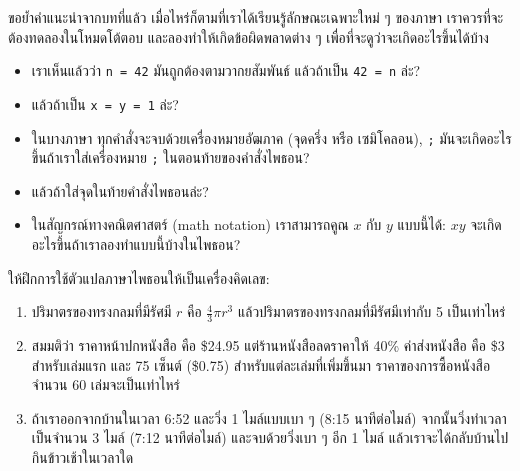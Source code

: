 \begin{exercise}

ขอย้ำคำแนะนำจากบทที่แล้ว เมื่อไหร่ก็ตามที่เราได้เรียนรู้ลักษณะเฉพาะใหม่ ๆ ของภาษา 
เราควรที่จะต้องทดลองในโหมดโต้ตอบ และลองทำให้เกิดข้อผิดพลาดต่าง ๆ 
เพื่อที่จะดูว่าจะเกิดอะไรขึ้นได้บ้าง

\begin{itemize}

\item เราเห็นแล้วว่า {\tt n = 42} มันถูกต้องตามวากยสัมพันธ์  แล้วถ้าเป็น {\tt 42 = n} ล่ะ?

\item แล้วถ้าเป็น {\tt x = y = 1} ล่ะ?

\item ในบางภาษา ทุกคำสั่งจะจบด้วยเครื่องหมายอัฒภาค (จุดครึ่ง หรือ เซมิโคลอน), {\tt ;} 
มันจะเกิดอะไรขึ้นถ้าเราใส่เครื่องหมาย {\tt ;} ในตอนท้ายของคำสั่งไพธอน?

\item แล้วถ้าใส่จุดในท้ายคำสั่งไพธอนล่ะ?

\item ในสัญกรณ์ทางคณิตศาสตร์ (math notation) เราสามารถคูณ $x$ กับ $y$ แบบนี้ได้: $x y$
จะเกิดอะไรขึ้นถ้าเราลองทำแบบนี้บ้างในไพธอน?

\end{itemize}

\end{exercise}


\begin{exercise}

ให้ฝึกการใช้ตัวแปลภาษาไพธอนให้เป็นเครื่องคิดเลข: 

\begin{enumerate}

\item ปริมาตรของทรงกลมที่มีรัศมี $r$ คือ $\frac{4}{3} \pi r^3$
แล้วปริมาตรของทรงกลมที่มีรัศมีเท่ากับ 5 เป็นเท่าไหร่

\item สมมติว่า ราคาหน้าปกหนังสือ คือ \$24.95 แต่ร้านหนังสือลดราคาให้ 40\% ค่าส่งหนังสือ คือ 
\$3 สำหรับเล่มแรก และ 75 เซ็นต์ (\$0.75) สำหรับแต่ละเล่มที่เพิ่มขึ้นมา ราคาของการซื้อหนังสือ
จำนวน 60 เล่มจะเป็นเท่าไหร่

\item ถ้าเราออกจากบ้านในเวลา 6:52 และวิ่ง 1 ไมล์แบบเบา ๆ  (8:15 นาทีต่อไมล์) 
จากนั้นวิ่งทำเวลาเป็นจำนวน 3 ไมล์ (7:12 นาทีต่อไมล์) และจบด้วยวิ่งเบา ๆ อีก 1 ไมล์ 
แล้วเราจะได้กลับบ้านไปกินข้าวเช้าในเวลาใด

\end{enumerate}
\end{exercise}



